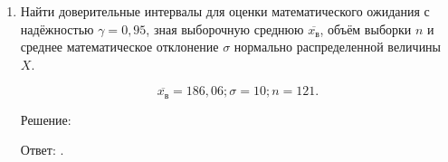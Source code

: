 \documentclass{article}
\begin{document}
\begin{enumerate}
\item %
Найти доверительные интервалы для оценки математического ожидания с надёжностью $\gamma=0,95$, зная выборочную среднюю $\overline{x_\textit{в}}$, объём выборки $n$ и среднее математическое отклонение $\sigma$ нормально распределенной величины $X$.

$$\overline{x_\textit{в}}=186,06; \sigma=10; n=121.$$
\begin{center}Решение:\end{center}

Ответ: $ $.

\end{enumerate}
\end{document}

